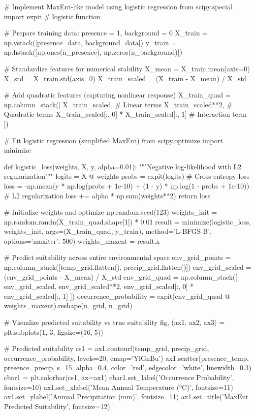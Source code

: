 \documentclass[11pt,a4paper]{article}
\begin{document}
\begin{pycode}
# Implement MaxEnt-like model using logistic regression
from scipy.special import expit  # logistic function

# Prepare training data: presence = 1, background = 0
X_train = np.vstack([presence_data, background_data])
y_train = np.hstack([np.ones(n_presence), np.zeros(n_background)])

# Standardize features for numerical stability
X_mean = X_train.mean(axis=0)
X_std = X_train.std(axis=0)
X_train_scaled = (X_train - X_mean) / X_std

# Add quadratic features (capturing nonlinear response)
X_train_quad = np.column_stack([
    X_train_scaled,  # Linear terms
    X_train_scaled**2,  # Quadratic terms
    X_train_scaled[:, 0] * X_train_scaled[:, 1]  # Interaction term
])

# Fit logistic regression (simplified MaxEnt)
from scipy.optimize import minimize

def logistic_loss(weights, X, y, alpha=0.01):
    """Negative log-likelihood with L2 regularization"""
    logits = X @ weights
    probs = expit(logits)
    # Cross-entropy loss
    loss = -np.mean(y * np.log(probs + 1e-10) + (1 - y) * np.log(1 - probs + 1e-10))
    # L2 regularization
    loss += alpha * np.sum(weights**2)
    return loss

# Initialize weights and optimize
np.random.seed(123)
weights_init = np.random.randn(X_train_quad.shape[1]) * 0.01
result = minimize(logistic_loss, weights_init, args=(X_train_quad, y_train),
                 method='L-BFGS-B', options={'maxiter': 500})
weights_maxent = result.x

# Predict suitability across entire environmental space
env_grid_points = np.column_stack([temp_grid.flatten(), precip_grid.flatten()])
env_grid_scaled = (env_grid_points - X_mean) / X_std
env_grid_quad = np.column_stack([
    env_grid_scaled,
    env_grid_scaled**2,
    env_grid_scaled[:, 0] * env_grid_scaled[:, 1]
])
occurrence_probability = expit(env_grid_quad @ weights_maxent).reshape(n_grid, n_grid)

# Visualize predicted suitability vs true suitability
fig, (ax1, ax2, ax3) = plt.subplots(1, 3, figsize=(16, 5))

# Predicted suitability
cs1 = ax1.contourf(temp_grid, precip_grid, occurrence_probability,
                  levels=20, cmap='YlGnBu')
ax1.scatter(presence_temp, presence_precip, s=15, alpha=0.4,
           color='red', edgecolor='white', linewidth=0.3)
cbar1 = plt.colorbar(cs1, ax=ax1)
cbar1.set_label('Occurrence Probability', fontsize=10)
ax1.set_xlabel('Mean Annual Temperature (°C)', fontsize=11)
ax1.set_ylabel('Annual Precipitation (mm)', fontsize=11)
ax1.set_title('MaxEnt Predicted Suitability', fontsize=12)


\end{pycode}
\end{document}
